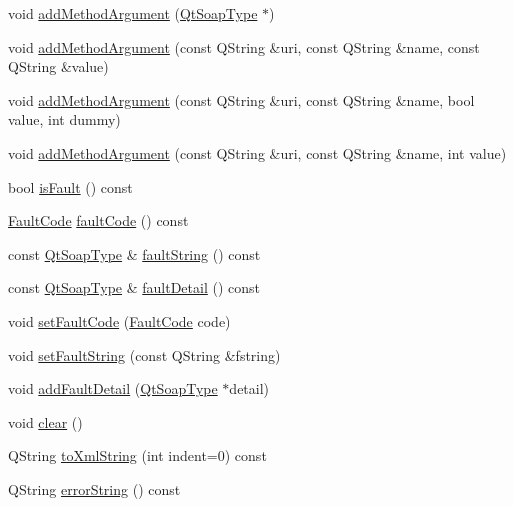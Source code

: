 \begin{DoxyCompactItemize}
\item 
void \mbox{\hyperlink{class_qt_soap_message_a07c31536525e366258d54c75d955de50}{add\+Method\+Argument}} (\mbox{\hyperlink{class_qt_soap_type}{Qt\+Soap\+Type}} $\ast$)
\item 
void \mbox{\hyperlink{class_qt_soap_message_a9ad20b534929c505e23902f9534d518f}{add\+Method\+Argument}} (const Q\+String \&uri, const Q\+String \&name, const Q\+String \&value)
\item 
void \mbox{\hyperlink{class_qt_soap_message_a980ff800439c59294e6c2ab7529b109e}{add\+Method\+Argument}} (const Q\+String \&uri, const Q\+String \&name, bool value, int dummy)
\item 
void \mbox{\hyperlink{class_qt_soap_message_a7a4d57e36365d255ec8d8fdf833c6507}{add\+Method\+Argument}} (const Q\+String \&uri, const Q\+String \&name, int value)
\item 
bool \mbox{\hyperlink{class_qt_soap_message_a7aa7a55d9f593144499f8622e8aa1ce5}{is\+Fault}} () const
\item 
\mbox{\hyperlink{class_qt_soap_message_ad27765646a4612b1f644229e9544b744}{Fault\+Code}} \mbox{\hyperlink{class_qt_soap_message_a2f5bbde1c34bddebd81ba112087c78c3}{fault\+Code}} () const
\item 
const \mbox{\hyperlink{class_qt_soap_type}{Qt\+Soap\+Type}} \& \mbox{\hyperlink{class_qt_soap_message_a11b95f781994094c764e457f800a3a21}{fault\+String}} () const
\item 
const \mbox{\hyperlink{class_qt_soap_type}{Qt\+Soap\+Type}} \& \mbox{\hyperlink{class_qt_soap_message_a6263ac6f8823f9e2a00e83ba2bf5c4dd}{fault\+Detail}} () const
\item 
void \mbox{\hyperlink{class_qt_soap_message_af8fd208d7b0a07f9b79581562da32b01}{set\+Fault\+Code}} (\mbox{\hyperlink{class_qt_soap_message_ad27765646a4612b1f644229e9544b744}{Fault\+Code}} code)
\item 
void \mbox{\hyperlink{class_qt_soap_message_ae671efb37455beb8b5ee1247098622b5}{set\+Fault\+String}} (const Q\+String \&fstring)
\item 
void \mbox{\hyperlink{class_qt_soap_message_af0cd7c0da675f83e91dcc5c29faf7382}{add\+Fault\+Detail}} (\mbox{\hyperlink{class_qt_soap_type}{Qt\+Soap\+Type}} $\ast$detail)
\item 
void \mbox{\hyperlink{class_qt_soap_message_aba7b362184f4d75405a237014d46cad6}{clear}} ()
\item 
Q\+String \mbox{\hyperlink{class_qt_soap_message_a5c9c6997f2ee1b35bf73a7988ef87213}{to\+Xml\+String}} (int indent=0) const
\item 
Q\+String \mbox{\hyperlink{class_qt_soap_message_a3ae2c2925bc7843e32d57dce0c318d41}{error\+String}} () const
\end{DoxyCompactItemize}
